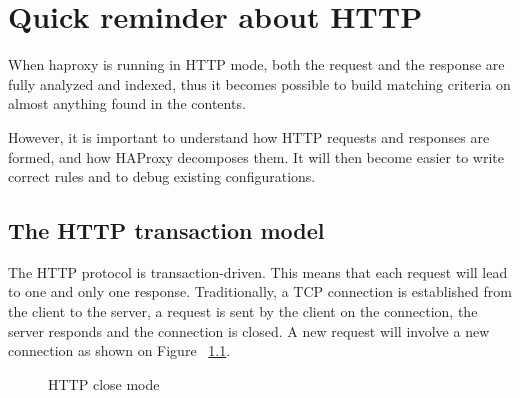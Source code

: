 \chapter{Quick reminder about HTTP}
When haproxy is running in HTTP mode, both the request and the response are
fully analyzed and indexed, thus it becomes possible to build matching criteria
on almost anything found in the contents.

However, it is important to understand how HTTP requests and responses are
formed, and how HAProxy decomposes them. It will then become easier to write
correct rules and to debug existing configurations.

\section{The HTTP transaction model}
The HTTP protocol is transaction-driven. This means that each request will lead
to one and only one response. Traditionally, a TCP connection is established
from the client to the server, a request is sent by the client on the
connection, the server responds and the connection is closed. A new request
will involve a new connection as shown on Figure ~\ref{fig:http_close}.

\begin{figure}[p]
  \centering
  \caption{HTTP close mode}
  \label{fig:http_close}
\end{figure}

